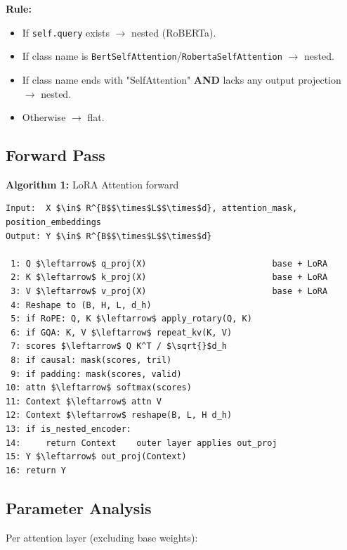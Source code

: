 \textbf{Rule:}
\begin{itemize}
\item If \texttt{self.query} exists $\to$ nested (RoBERTa).
\item If class name is \texttt{BertSelfAttention}/\texttt{RobertaSelfAttention} $\to$ nested.
\item If class name ends with "SelfAttention" \textbf{AND} lacks any output projection $\to$ nested.
\item Otherwise $\to$ flat.

\end{itemize}
\subsection{Forward Pass}

\textbf{Algorithm 1:} LoRA Attention forward
\begin{lstlisting}
Input:  X $\in$ R^{B$$\times$L$$\times$d}, attention_mask, position_embeddings
Output: Y $\in$ R^{B$$\times$L$$\times$d}

 1: Q $\leftarrow$ q_proj(X)                         base + LoRA
 2: K $\leftarrow$ k_proj(X)                         base + LoRA
 3: V $\leftarrow$ v_proj(X)                         base + LoRA
 4: Reshape to (B, H, L, d_h)
 5: if RoPE: Q, K $\leftarrow$ apply_rotary(Q, K)
 6: if GQA: K, V $\leftarrow$ repeat_kv(K, V)
 7: scores $\leftarrow$ Q K^T / $\sqrt{}$d_h
 8: if causal: mask(scores, tril)
 9: if padding: mask(scores, valid)
10: attn $\leftarrow$ softmax(scores)
11: Context $\leftarrow$ attn V
12: Context $\leftarrow$ reshape(B, L, H d_h)
13: if is_nested_encoder:
14:     return Context    outer layer applies out_proj
15: Y $\leftarrow$ out_proj(Context)
16: return Y
\end{lstlisting}

\subsection{Parameter Analysis}

Per attention layer (excluding base weights):

